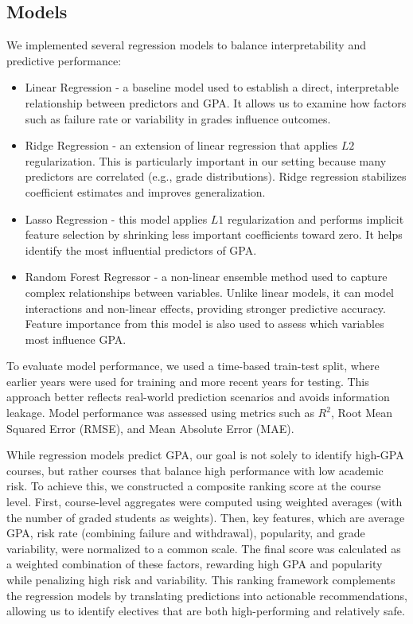 \documentclass[a4paper,12pt,reqno]{amsart}
\numberwithin{equation}{section}
\theoremstyle{plain}
\theoremstyle{definition}
\begin{document}
\subsection{Models}
We implemented several regression models to balance interpretability and predictive performance:
\begin{itemize}
    \item Linear Regression - a baseline model used to establish a direct, interpretable relationship between predictors and GPA. It allows us to examine how factors such as failure rate or variability in grades influence outcomes.
    \item Ridge Regression - an extension of linear regression that applies $L2$ regularization. This is particularly important in our setting because many predictors are correlated (e.g., grade distributions). Ridge regression stabilizes coefficient estimates and improves generalization.
    \item Lasso Regression - this model applies $L1$ regularization and performs implicit feature selection by shrinking less important coefficients toward zero. It helps identify the most influential predictors of GPA.
    \item Random Forest Regressor - a non-linear ensemble method used to capture complex relationships between variables. Unlike linear models, it can model interactions and non-linear effects, providing stronger predictive accuracy. Feature importance from this model is also used to assess which variables most influence GPA.
\end{itemize} 

To evaluate model performance, we used a time-based train-test split, where earlier years were used for training and more recent years for testing. This approach better reflects real-world prediction scenarios and avoids information leakage. Model performance was assessed using metrics such as $R^2$, Root Mean Squared Error (RMSE), and Mean Absolute Error (MAE).

While regression models predict GPA, our goal is not solely to identify high-GPA courses, but rather courses that balance high performance with low academic risk. To achieve this, we constructed a composite ranking score at the course level.
First, course-level aggregates were computed using weighted averages (with the number of graded students as weights). Then, key features, which are average GPA, risk rate (combining failure and withdrawal), popularity, and grade variability, were normalized to a common scale. The final score was calculated as a weighted combination of these factors, rewarding high GPA and popularity while penalizing high risk and variability.
This ranking framework complements the regression models by translating predictions into actionable recommendations, allowing us to identify electives that are both high-performing and relatively safe.
\end{document}
